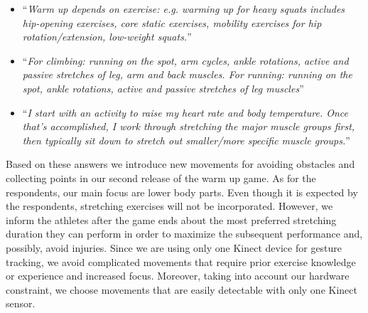 \begin{itemize}
\item ``\textit{Warm up depends on exercise: e.g. warming up for heavy squats includes hip-opening exercises, core static exercises, mobility exercises for hip rotation/extension, low-weight squats.}''
\item ``\textit{For climbing: running on the spot, arm cycles, ankle rotations, active and passive stretches of leg, arm and back muscles.  For running: running on the spot, ankle rotations, active and passive stretches of leg muscles}''
\item ``\textit{I start with an activity to raise my heart rate and body temperature. Once that's accomplished, I work through stretching the major muscle groups first, then typically sit down to stretch out smaller/more specific muscle groups.}''
\end{itemize}
Based on these answers we introduce new movements for avoiding obstacles and collecting points in our second release of the warm up game. As for the respondents, our main focus are lower body parts. Even though it is expected by the respondents, stretching exercises will not be incorporated. However, we inform the athletes after the game ends about the most preferred stretching duration they can perform in order to maximize the subsequent performance and, possibly, avoid injuries. Since we are using only one Kinect device for gesture tracking, we avoid complicated movements that require prior exercise knowledge or experience and increased focus. Moreover, taking into account our hardware constraint, we choose movements that are easily detectable with only one Kinect sensor. 
